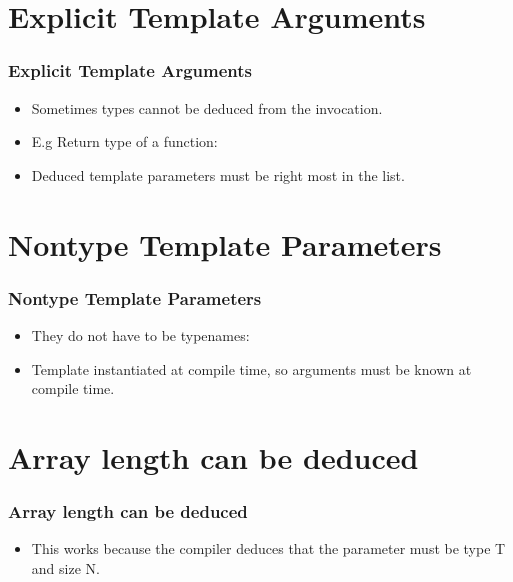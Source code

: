 \documentclass{beamer}
\begin{document}
\section{Explicit Template Arguments}
\begin{frame}
\frametitle{Explicit Template Arguments}
\begin{itemize}
\item Sometimes types cannot be deduced from the invocation.
\item E.g Return type of a function:
\exp
\vspace{-0.5cm}
\item Deduced template parameters must be right most in the list.
\end{itemize}
\end{frame}
\section{Nontype Template Parameters}
\begin{frame}
\frametitle{Nontype Template Parameters}
\begin{itemize}
\item They do not have to be typenames:
\non
\item Template instantiated at compile time, so arguments must be known at compile time.
\end{itemize}
\end{frame}
\section{Array length can be deduced}
\begin{frame}
\frametitle{Array length can be deduced}
\arr
\begin{itemize}
\item This works because the compiler deduces that the parameter must be type T and size N.
\end{itemize}
\end{frame}
\end{document}
